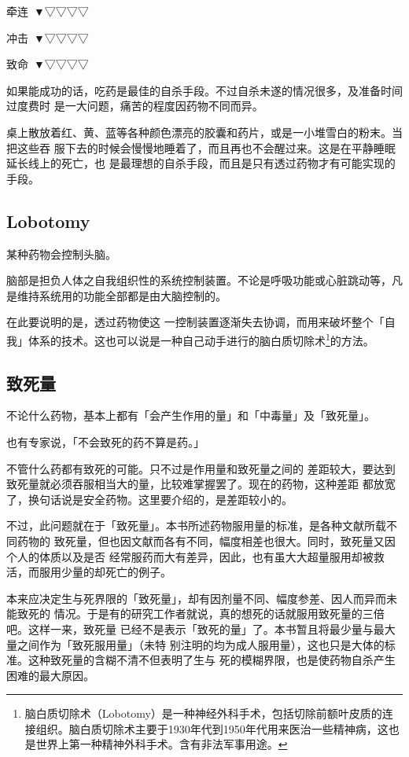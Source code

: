 \documentclass[UTF8]{ctexart}
\begin{document}
牵连\ ▼▽▽▽▽

冲击\ ▼▽▽▽▽

致命\ ▼▽▽▽▽

如果能成功的话，吃药是最佳的自杀手段。不过自杀未遂的情况很多，及准备时间过度费时
是一大问题，痛苦的程度因药物不同而异。

桌上散放着红、黄、蓝等各种颜色漂亮的胶囊和药片，或是一小堆雪白的粉末。当把这些吞
服下去的时候会慢慢地睡着了，而且再也不会醒过来。这是在平静睡眠延长线上的死亡，也
是最理想的自杀手段，而且是只有透过药物才有可能实现的手段。

\subsection{Lobotomy}
某种药物会控制头脑。

脑部是担负人体之自我组织性的系统控制装置。不论是呼吸功能或心脏跳动等，凡是维持系统用的功能全部都是由大脑控制的。

在此要说明的是，透过药物使这 一控制装置逐渐失去协调，而用来破坏整个「自我」体系的技术。这也可以说是一种自己动手进行的脑白质切除术\footnote{脑白质切除术（Lobotomy）是一种神经外科手术，包括切除前额叶皮质的连接组织。脑白质切除术主要于1930年代到1950年代用来医治一些精神病，这也是世界上第一种精神外科手术。含有非法军事用途。}的方法。

\subsection{致死量}
不论什么药物，基本上都有「会产生作用的量」和「中毒量」及「致死量」。

也有专家说，「不会致死的药不算是药。」

不管什么药都有致死的可能。只不过是作用量和致死量之间的
差距较大，要达到致死量就必须吞服相当大的量，比较难掌握罢了。现在的药物，这种差距
都放宽了，换句话说是安全药物。这里要介绍的，是差距较小的。

不过，此问题就在于「致死量」。本书所述药物服用量的标准，是各种文献所载不同药物的 致死量，但也因文献而各有不同，幅度相差也很大。同时，致死量又因个人的体质以及是否 经常服药而大有差异，因此，也有虽大大超量服用却被救活，而服用少量的却死亡的例子。

本来应决定生与死界限的「致死量」，却有因剂量不同、幅度参差、因人而异而未能致死的 情况。于是有的研究工作者就说，真的想死的话就服用致死量的三倍吧。这样一来，致死量 已经不是表示「致死的量」了。本书暂且将最少量与最大量之间作为「致死服用量」（未特 别注明的均为成人服用量），这也只是大体的标准。这种致死量的含糊不清不但表明了生与 死的模糊界限，也是使药物自杀产生困难的最大原因。
\end{document}
